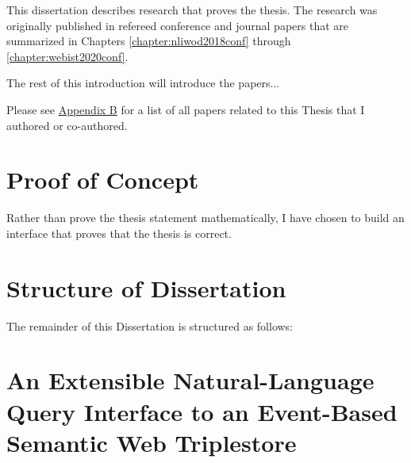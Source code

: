 \documentclass[../main.tex]{subfiles}
\begin{document}
\begin{refsection}
This dissertation describes research that proves the thesis. The research was originally published in refereed conference and journal papers that are summarized in Chapters \ref{chapter:nliwod2018conf} through \ref{chapter:webist2020conf}.

The rest of this introduction will introduce the papers...

Please see \hyperref[appendix:b]{Appendix B} for a list of all papers related to this Thesis that I authored or co-authored. \cite{peelar2016accommodating}

\section{Proof of Concept}

Rather than prove the thesis statement mathematically, I have chosen to build an interface that
proves that the thesis is correct.

\section{Structure of Dissertation}

The remainder of this Dissertation is structured as follows:


\section{An Extensible Natural-Language Query Interface to an Event-Based Semantic Web Triplestore}



\end{refsection}
\end{document}
